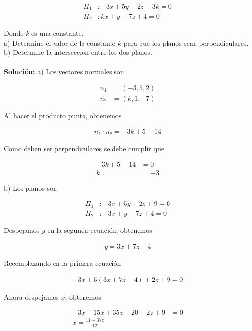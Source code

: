 \documentclass{article}
\theoremstyle{definition}
\begin{document}
\begin{align*}
    \Pi_1 &: -3x+5y+2z-3k = 0 \\
    \Pi_2 &: kx+ y-7z +4 =0
\end{align*}

Donde $k$ es una constante. \\

a)  Determine el valor de la constante $k$ para que los planos sean perpendiculares. \\ 

b) Determine la intersección entre los dos planos. \\ \\ 


\textbf{Solución:} a) Los vectores normales son

\begin{align*}
    n_1 &= (-3,5,2) \\
    n_2 &= (k,1,-7)
\end{align*}

Al hacer el producto punto, obtenemos

\begin{align*}
    n_1 \cdot n_2 = -3k+5-14
\end{align*}

Como deben ser perpendiculares se debe cumplir que

\begin{align*}
    -3k+5-14 &=0 \\
    k &= -3
\end{align*}

b) Los planos son

\begin{align*}
    \Pi_1 &: -3x+5y+2z+9 = 0 \\
    \Pi_2 &: -3x+ y-7z +4 =0
\end{align*}

Despejamos $y$ en la segunda ecuación, obtenemos

\begin{align*}
    y =3x+7z-4
\end{align*}

Reeemplazando en la primera ecuación

\begin{align*}
    -3x+5(3x+7z-4)+2z+9 = 0 
\end{align*}

Ahora despejamos $x$, obtenemos


\begin{align*}
    -3x+15x+35z-20+2z+9 &= 0 \\
    x = \frac{11-37z}{12}
\end{align*}
\end{document}
